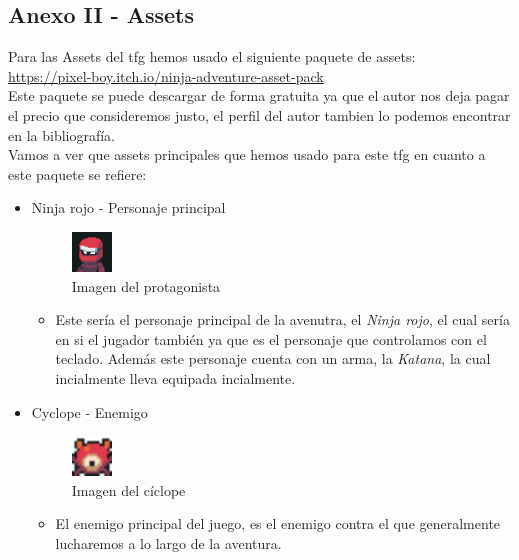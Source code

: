 \documentclass[a4paper]{article}
\begin{document}
\begin{appendices}
    \section{Anexo II - Assets}
    Para las Assets del tfg hemos usado el siguiente paquete de assets: \\
    \url{https://pixel-boy.itch.io/ninja-adventure-asset-pack} \\
    Este paquete se puede descargar de forma gratuita ya que el autor nos deja pagar el precio que consideremos justo, el perfil del autor tambien lo podemos encontrar en la bibliografía. \\
    Vamos a ver que assets principales que hemos usado para este tfg en cuanto a este paquete se refiere:
    \begin{itemize}
        \item Ninja rojo - Personaje principal
        \begin{figure}[ht]
            \centering
            \includegraphics[width=0.1\textwidth]{Images/FacesetPlayer.png}
            \caption{Imagen del protagonista}
            \label{fig:player}
        \end{figure}
        \begin{itemize}
            \item Este sería el personaje principal de la avenutra, el \textit{Ninja rojo}, el cual sería en si el jugador también ya que es el personaje que controlamos con el teclado. Además este
            personaje cuenta con un arma, la \textit{Katana}, la cual incialmente lleva equipada incialmente.
        \end{itemize}
        \item Cyclope - Enemigo
        \begin{figure}[ht]
            \centering
            \includegraphics[width=0.1\textwidth]{Images/monster1.png}
            \caption{Imagen del cíclope}
            \label{fig:ciclope}
        \end{figure}
        \begin{itemize}
            \item El enemigo principal del juego, es el enemigo contra el que generalmente lucharemos a lo largo de la aventura.

\end{itemize}
\end{itemize}
\end{appendices}
\end{document}
